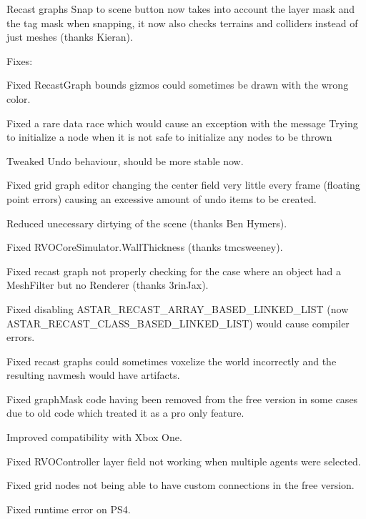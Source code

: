 \begin{DoxyItemize}
\begin{DoxyItemize}
\begin{DoxyItemize}
\item Recast graphs\textquotesingle{} \textquotesingle{}Snap to scene\textquotesingle{} button now takes into account the layer mask and the tag mask when snapping, it now also checks terrains and colliders instead of just meshes (thanks Kieran).
\end{DoxyItemize}
\item Fixes\+:
\begin{DoxyItemize}
\item Fixed Recast\+Graph bounds gizmos could sometimes be drawn with the wrong color.
\item Fixed a rare data race which would cause an exception with the message \textquotesingle{}Trying to initialize a node when it is not safe to initialize any nodes\textquotesingle{} to be thrown
\item Tweaked Undo behaviour, should be more stable now.
\item Fixed grid graph editor changing the center field very little every frame (floating point errors) causing an excessive amount of undo items to be created.
\item Reduced unecessary dirtying of the scene (thanks Ben Hymers).
\item Fixed R\+V\+O\+Core\+Simulator.\+Wall\+Thickness (thanks tmcsweeney).
\item Fixed recast graph not properly checking for the case where an object had a Mesh\+Filter but no Renderer (thanks 3rin\+Jax).
\item Fixed disabling A\+S\+T\+A\+R\+\_\+\+R\+E\+C\+A\+S\+T\+\_\+\+A\+R\+R\+A\+Y\+\_\+\+B\+A\+S\+E\+D\+\_\+\+L\+I\+N\+K\+E\+D\+\_\+\+L\+I\+ST (now A\+S\+T\+A\+R\+\_\+\+R\+E\+C\+A\+S\+T\+\_\+\+C\+L\+A\+S\+S\+\_\+\+B\+A\+S\+E\+D\+\_\+\+L\+I\+N\+K\+E\+D\+\_\+\+L\+I\+ST) would cause compiler errors.
\item Fixed recast graphs could sometimes voxelize the world incorrectly and the resulting navmesh would have artifacts.
\item Fixed graph\+Mask code having been removed from the free version in some cases due to old code which treated it as a pro only feature.
\item Improved compatibility with Xbox One.
\item Fixed R\+V\+O\+Controller layer field not working when multiple agents were selected.
\item Fixed grid nodes not being able to have custom connections in the free version.
\item Fixed runtime error on P\+S4.

\end{DoxyItemize}
\end{DoxyItemize}
\end{DoxyItemize}
